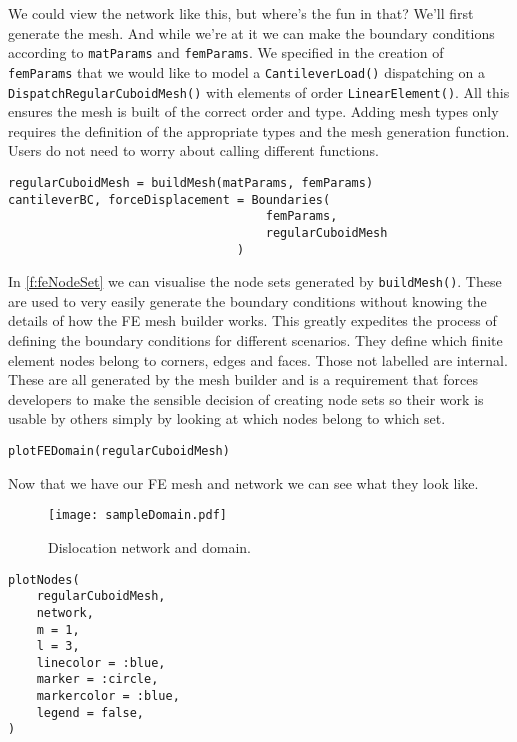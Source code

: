 We could view the network like this, but where's the fun in that? We'll first generate the mesh. And while we're at it we can make the boundary conditions according to \texttt{matParams} and \texttt{femParams}. We specified in the creation of \texttt{femParams} that we would like to model a \texttt{CantileverLoad()} dispatching on a \texttt{DispatchRegularCuboidMesh()} with elements of order \texttt{LinearElement()}. All this ensures the mesh is built of the correct order and type. Adding mesh types only requires the definition of the appropriate types and the mesh generation function. Users do not need to worry about calling different functions.
\begin{verbatim}
regularCuboidMesh = buildMesh(matParams, femParams)
cantileverBC, forceDisplacement = Boundaries(
                                    femParams, 
                                    regularCuboidMesh
                                )
\end{verbatim}
In \cref{f:feNodeSet} we can visualise the node sets generated by \texttt{buildMesh()}. These are used to very easily generate the boundary conditions without knowing the details of how the FE mesh builder works. This greatly expedites the process of defining the boundary conditions for different scenarios. They define which finite element nodes belong to corners, edges and faces. Those not labelled are internal. These are all generated by the mesh builder and is a requirement that forces developers to make the sensible decision of creating node sets so their work is usable by others simply by looking at which nodes belong to which set.

\begin{verbatim}
plotFEDomain(regularCuboidMesh)
\end{verbatim}

Now that we have our FE mesh and network we can see what they look like.
\begin{figure}
    \centering
    \texttt{[image: sampleDomain.pdf]}
    \caption[Sample network and domain.]{Dislocation network and domain.}
\end{figure}
\begin{verbatim}
plotNodes(
    regularCuboidMesh,
    network,
    m = 1,
    l = 3,
    linecolor = :blue,
    marker = :circle,
    markercolor = :blue,
    legend = false,
)
\end{verbatim}

